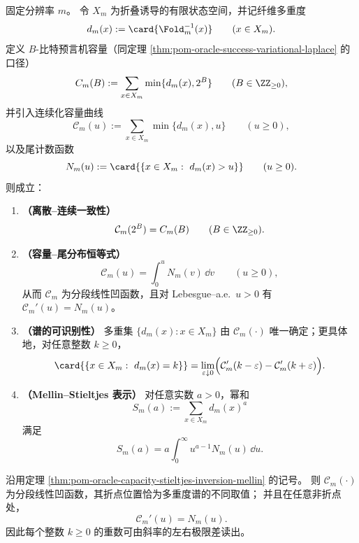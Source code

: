 \begin{theorem}\label{thm:pom-oracle-capacity-stieltjes-inversion-mellin}
固定分辨率 \(m\)。
令 \(X_m\) 为折叠诱导的有限状态空间，并记纤维多重度
\[
d_m(x):=\card{\Fold_m^{-1}(x)}\qquad(x\in X_m).
\]
定义 \(B\)-比特预言机容量（同定理 \ref{thm:pom-oracle-success-variational-laplace} 的口径）
\[
C_m(B):=\sum_{x\in X_m}\min\{d_m(x),2^B\}\qquad(B\in\ZZ_{\ge 0}),
\]
并引入连续化容量曲线
\[
\mathcal{C}_m(u):=\sum_{x\in X_m}\min\{d_m(x),u\}\qquad(u\ge 0),
\]
以及尾计数函数
\[
N_m(u):=\card{\{x\in X_m:\ d_m(x)>u\}}\qquad(u\ge 0).
\]
则成立：
\begin{enumerate}
  \item \textbf{（离散--连续一致性）}
  \[
  \mathcal{C}_m(2^B)=C_m(B)\qquad(B\in\ZZ_{\ge 0}).
  \]
  \item \textbf{（容量--尾分布恒等式）}
  \[
  \mathcal{C}_m(u)=\int_{0}^{u}N_m(v)\,\dd v\qquad(u\ge 0),
  \]
  从而 \(\mathcal{C}_m\) 为分段线性凹函数，且对 Lebesgue--a.e.\ \(u>0\) 有 \(\mathcal{C}_m'(u)=N_m(u)\)。
  \item \textbf{（谱的可识别性）}
  多重集 \(\{d_m(x):x\in X_m\}\) 由 \(\mathcal{C}_m(\cdot)\) 唯一确定；更具体地，对任意整数 \(k\ge 0\)，
  \[
  \card{\{x\in X_m:\ d_m(x)=k\}}
  =
  \lim_{\varepsilon\downarrow 0}\Bigl(\mathcal{C}_m'(k-\varepsilon)-\mathcal{C}_m'(k+\varepsilon)\Bigr).
  \]
  \item \textbf{（Mellin--Stieltjes 表示）}
  对任意实数 \(a>0\)，幂和
  \[
  S_m(a):=\sum_{x\in X_m}d_m(x)^a
  \]
  满足
  \[
  S_m(a)=a\int_{0}^{\infty}u^{a-1}N_m(u)\,\dd u.
  \]
\end{enumerate}
\end{theorem}

\begin{corollary}[容量曲线的折点与斜率跳跃]\label{cor:pom-oracle-capacity-kinks-slopes}
沿用定理 \ref{thm:pom-oracle-capacity-stieltjes-inversion-mellin} 的记号。
则 \(\mathcal{C}_m(\cdot)\) 为分段线性凹函数，其折点位置恰为多重度谱的不同取值；
并且在任意非折点处，
\[
\mathcal{C}_m'(u)=N_m(u).
\]
因此每个整数 \(k\ge 0\) 的重数可由斜率的左右极限差读出。
\end{corollary}

